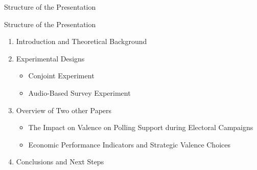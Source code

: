 \documentclass[9pt, aspectratio=169]{beamer}
\begin{document}
\begin{section}{Structure of the Presentation}
\begin{frame}{Structure of the Presentation}
    \setcounter{framenumber}{1}
    \begin{enumerate}
        \item Introduction and Theoretical Background \vspace{0.4cm}
        \item Experimental Designs \vspace{0.4cm}
        \begin{itemize}
            \item Conjoint Experiment \vspace{0.2cm}
            \item Audio-Based Survey Experiment
        \end{itemize}\vspace{0.4cm}
        \item Overview of Two other Papers \vspace{0.4cm}
        \begin{itemize}
        \item The Impact on Valence on Polling Support during Electoral Campaigns \vspace{0.2cm}
        \item Economic Performance Indicators and Strategic Valence Choices \vspace{0.2cm}
        \end{itemize}
        \item Conclusions and Next Steps \vspace{0.4cm}
    \end{enumerate}
    \end{frame}


\end{section}
\end{document}
